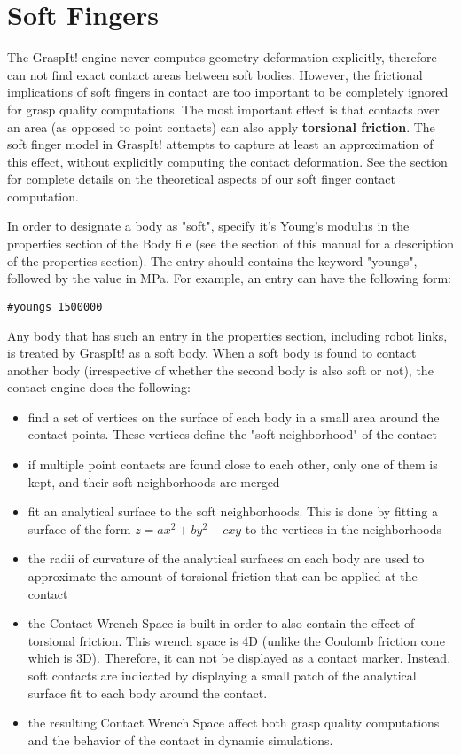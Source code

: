 \section{Soft Fingers}
\label{sec:softFingers}


The GraspIt! engine never computes geometry deformation explicitly,
therefore can not find exact contact areas between soft
bodies. However, the frictional implications of soft fingers in
contact are too important to be completely ignored for grasp quality
computations. The most important effect is that contacts over an area
(as opposed to point contacts) can also apply \textbf{torsional
  friction}. The soft finger model in GraspIt! attempts to capture at
least an approximation of this effect, without explicitly computing
the contact deformation. See the 
section for complete details on the theoretical aspects of our soft
finger contact computation.

In order to designate a body as "soft", specify it's Young's modulus
in the properties section of the Body file (see the  section of this manual for a description of the
properties section). The entry should contains the keyword "youngs",
followed by the value in MPa. For example, an entry can have the
following form:

\texttt{\#youngs 1500000}

Any body that has such an entry in the properties section, including
robot links, is treated by GraspIt! as a soft body. When a soft body
is found to contact another body (irrespective of whether the second
body is also soft or not), the contact engine does the following:
\begin{itemize}
\item find a set of vertices on the surface of each body in a small
  area around the contact points. These vertices define the "soft
  neighborhood" of the contact
\item if multiple point contacts are found close to each other, only
  one of them is kept, and their soft neighborhoods are merged
\item fit an analytical surface to the soft neighborhoods. This is
  done by fitting a surface of the form $z=ax^2+by^2+cxy$ to
  the vertices in the neighborhoods
\item the radii of curvature of the analytical surfaces on each body
  are used to approximate the amount of torsional friction that can be
  applied at the contact
\item the Contact Wrench Space is built in order to also contain the
  effect of torsional friction. This wrench space is 4D (unlike the
  Coulomb friction cone which is 3D). Therefore, it can not be
  displayed as a contact marker. Instead, soft contacts are indicated
  by displaying a small patch of the analytical surface fit to each
  body around the contact.
\item the resulting Contact Wrench Space affect both grasp quality
  computations and the behavior of the contact in dynamic simulations.
\end{itemize}

